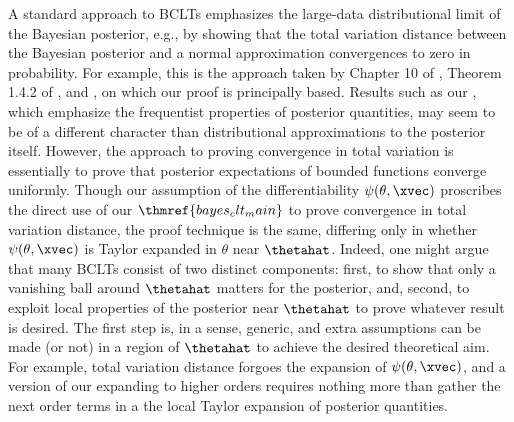 

A standard approach to BCLTs emphasizes the large-data distributional limit of
the Bayesian posterior, e.g., by showing that the total variation distance
between the Bayesian posterior and a normal approximation convergences to zero
in probability.  For example, this is the approach taken by Chapter 10 of
\citet{van:2000:asymptotic}, Theorem 1.4.2 of \citet{ghosh:2003:bayesian}, and
\citet{lehman:1983:pointestimation}, on which our proof is principally based.
Results such as our , which emphasize the frequentist
properties of posterior quantities, may seem to be of a different character than
distributional approximations to the posterior itself.  However, the approach to
proving convergence in total variation is essentially to prove that posterior
expectations of bounded functions converge uniformly.  Though our assumption of
the differentiability $\psi(\theta, \xvec)$ proscribes the direct use of our
$\thmref{bayes_clt_main}$ to prove convergence in total variation distance, the proof
technique is the same, differing only in whether $\psi(\theta, \xvec)$ is Taylor
expanded in $\theta$ near $\thetahat$.  Indeed, one might argue that many BCLTs
consist of two distinct components: first, to show that only a vanishing ball
around $\thetahat$ matters for the posterior, and, second, to exploit
local properties of the posterior near $\thetahat$ to prove whatever result
is desired.  The first step is, in a sense, generic, and extra assumptions
can be made (or not) in a region of $\thetahat$ to achieve the desired
theoretical aim.  For example, total variation distance forgoes the
expansion of $\psi(\theta, \xvec)$, and a version of our 
expanding to higher orders requires nothing more than gather the next order
terms in a the local Taylor expansion of posterior quantities.

